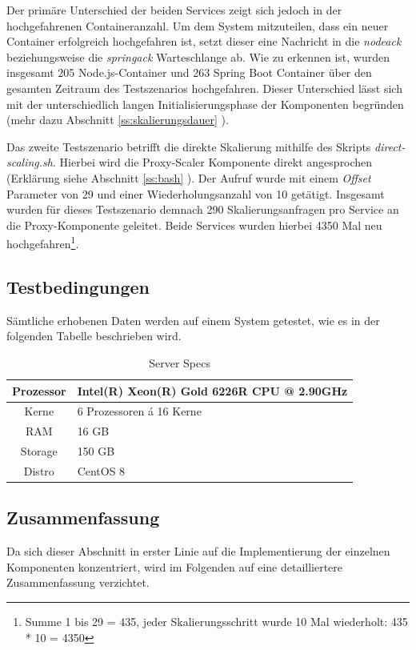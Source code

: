 Der primäre Unterschied der beiden Services zeigt sich jedoch in der hochgefahrenen Containeranzahl. Um dem System mitzuteilen, dass ein neuer Container erfolgreich hochgefahren ist, setzt dieser eine Nachricht in die \emph{nodeack} beziehungsweise die \emph{springack} Warteschlange ab. Wie zu erkennen ist, wurden insgesamt 205 Node.js-Container und 263 Spring Boot Container über den gesamten Zeitraum des Testszenarios hochgefahren. Dieser Unterschied lässt sich mit der unterschiedlich langen Initialisierungsphase der Komponenten begründen (mehr dazu Abschnitt \ref{ss:skalierungsdauer} ).

Das zweite Testszenario betrifft die direkte Skalierung mithilfe des Skripts \emph{direct-scaling.sh}. Hierbei wird die Proxy-Scaler Komponente direkt angesprochen (Erklärung siehe Abschnitt \ref{ss:bash} ). Der Aufruf wurde mit einem \emph{Offset} Parameter von 29 und einer Wiederholungsanzahl von 10 getätigt. Insgesamt wurden für dieses Testszenario demnach 290 Skalierungsanfragen pro Service an die Proxy-Komponente geleitet. Beide Services wurden hierbei 4350 Mal neu hochgefahren\footnote{Summe 1 bis 29 = 435, jeder Skalierungsschritt wurde 10 Mal wiederholt: 435 * 10 = 4350}.

\subsection{Testbedingungen}

Sämtliche erhobenen Daten werden auf einem System getestet, wie es in der folgenden Tabelle beschrieben wird. 

\renewcommand\theadalign{bc}
\renewcommand\theadfont{\bfseries}
\renewcommand\theadgape{\Gape[4pt]}
\renewcommand\cellgape{\Gape[4pt]}

\begin{table}[ht!]
  \centering
  \bigskip
  \begin{tabular}{ c l }
    \toprule
    Prozessor & Intel(R) Xeon(R) Gold 6226R CPU @ 2.90GHz \\
    \midrule
    Kerne & 6 Prozessoren á 16 Kerne \\
    \midrule
    RAM & 16 GB \\
    \midrule
    Storage & 150 GB \\
    \midrule
    Distro & CentOS 8\\
    \bottomrule
  \end{tabular}
  \caption{Server Specs}
  \label{tab:serverSpecs}
\end{table}


\subsection{Zusammenfassung}
Da sich dieser Abschnitt in erster Linie auf die Implementierung der einzelnen Komponenten konzentriert, wird im Folgenden auf eine detailliertere Zusammenfassung verzichtet. 
